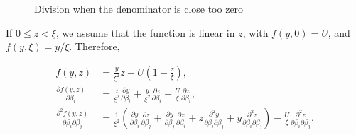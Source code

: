\documentclass[12pt,a4paper]{article}
\begin{document}
\begin{description}
\begin{figure}[htb]
\begin{center}
  \end{center}
  \caption{\label{fig:quotient}Division when the denominator is close too zero}
  \end{figure}



  If $0 \leq z < \xi$, we assume that the function is linear in $z$, with $f(y, 0) = U$, and $f(y,  \xi)= y/\xi$. Therefore,

  \begin{align*}
    f(y, z) &=\frac{y}{\xi^2} z + U \left(1 - \frac{z}{\xi}\right),  \\
    \frac{\partial f(y, z)}{\partial \beta_i} &= \frac{z}{\xi^2} \frac{\partial y}{\partial \beta_i} + \frac{y}{\xi^2} \frac{\partial z}{\partial \beta_i} -\frac{ U}{\xi} \frac{\partial z}{\partial \beta_i},   \\
    \frac{\partial^2 f(y, z)}{\partial \beta_i \partial \beta_j} &=
    \frac{1}{\xi^2} \left( \frac{\partial y}{\partial \beta_i} \frac{\partial z}{\partial \beta_j}
    + \frac{\partial y}{\partial \beta_j} \frac{\partial z}{\partial \beta_i} +z \frac{\partial^2 y}{\partial \beta_i \partial \beta_j} + y \frac{\partial^2 z}{\partial \beta_i \partial \beta_j}\right) - \frac{U}{\xi}\frac{\partial^2 z}{\partial \beta_i \partial \beta_j}.
  \end{align*}



\end{description}
\end{document}
